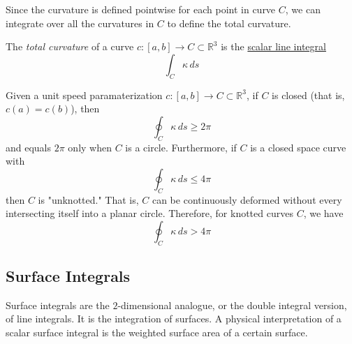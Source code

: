   Since the curvature is defined pointwise for each point in curve $C$, we can integrate over all the curvatures in $C$ to define the total curvature. 
		
  \begin{definition}
    \label{def:total-curvature}
		The \textit{total curvature} of a curve $c: [a,b] \to C \subset \mathbb{R}^3$ is the \hyperref[def:scalar-line-integral]{scalar line integral} 
		\begin{equation}
			\int_C \kappa \, ds
		\end{equation}
  \end{definition}
		
  \begin{theorem}
    \label{thm:fary-milnor-theorem}
		Given a unit speed paramaterization $c: [a,b] \to C \subset \mathbb{R}^3$, if $C$ is closed (that is, $c(a)=c(b)$), then 
		\begin{equation}
			\oint_C \kappa\, ds \geq 2 \pi
		\end{equation}
		and equals $2\pi$ only when $C$ is a circle. Furthermore, if $C$ is a closed space curve with 
		\begin{equation}
			\oint_C \kappa\, ds \leq 4\pi
		\end{equation}
		then $C$ is "unknotted." That is, $C$ can be continuously deformed without every intersecting itself into a planar circle. Therefore, for knotted curves $C$, we have
		\begin{equation}
			\oint_C \kappa \, ds > 4\pi
		\end{equation}
  \end{theorem}
		
\subsection{Surface Integrals}
		
  Surface integrals are the $2$-dimensional analogue, or the double integral version, of line integrals. It is the integration of surfaces. A physical interpretation of a scalar surface integral is the weighted surface area of a certain surface. 
		
